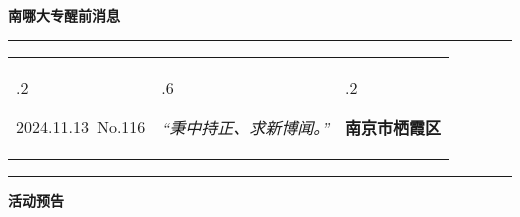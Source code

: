 \documentclass[letterpaper, 12pt]{article}
\begin{document}
\begin{center}
    \Huge\textbf{南哪大专醒前消息}
\end{center}
\vspace{4mm}
\hrule
\renewcommand\tabularxcolumn[1]{m{#1}}
\begin{tabularx}{\textwidth}{>{\hsize.2\hsize}X>{\hsize.6\hsize}X>{\hsize.2\hsize}X}
    \begin{flushleft}
        2024.11.13\, No.116
    \end{flushleft}
    &
    \begin{center}
        \textit{“秉中持正、求新博闻。”}
    \end{center}
    &
    \begin{flushright}
        \textbf{南京市栖霞区}
    \end{flushright}
\end{tabularx}
\vspace{-3.5mm}
\hrule
\vspace{4mm}
\centerline{\huge\textbf{活动预告}}
\end{document}
